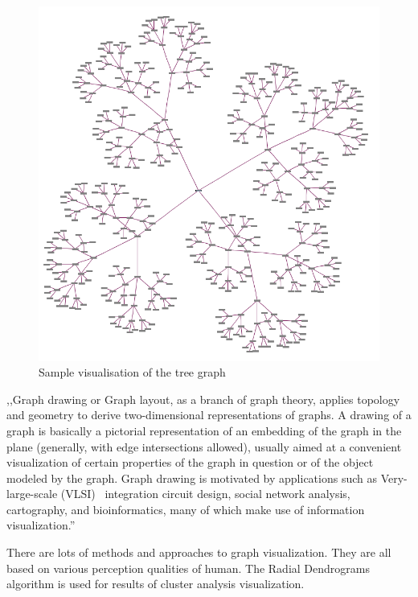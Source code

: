 \begin{figure}[h!]
\centering
\includegraphics[scale=0.3]{pictures/Tree_graph_example.png}
\caption{Sample visualisation of the tree graph}
\label{fig:tree_graph_example}
\end{figure}

,,Graph drawing or Graph layout, as a branch of graph theory, applies topology and geometry to derive two-dimensional representations of graphs. A drawing of a graph is basically a pictorial representation of an embedding of the graph in the plane (generally, with edge intersections allowed), usually aimed at a convenient visualization of certain properties of the graph in question or of the object modeled by the graph. Graph drawing is motivated by applications such as Very-large-scale (VLSI)~\cite{VLSI} integration circuit design, social network analysis, cartography, and bioinformatics, many of which make use of information visualization.''~\cite{Graph_drawing}

There are lots of methods and approaches to graph visualization. They are all based on various perception qualities of human. The Radial Dendrograms~\cite{Radial_dendrogram} algorithm is used for results of cluster analysis visualization.


